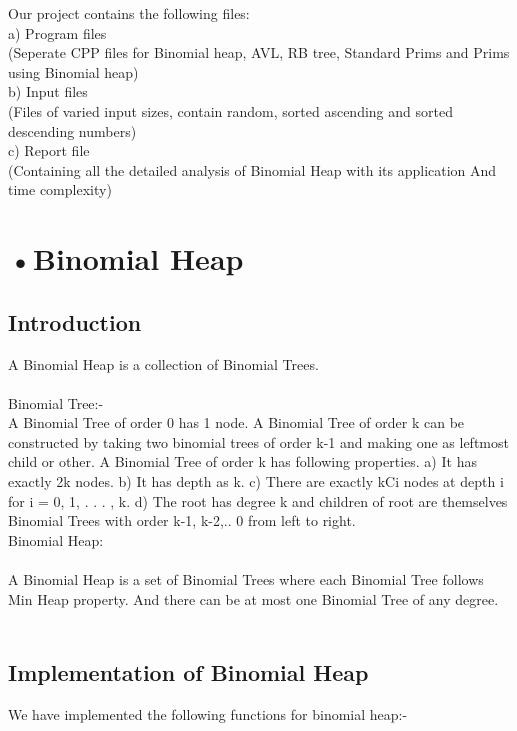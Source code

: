 Our project contains the following files:\\
a) Program files\\
	(Seperate CPP files for Binomial heap, AVL, RB tree, Standard Prims and Prims using Binomial heap)\\

b) Input files \\
	(Files of varied input sizes, contain random, sorted ascending and sorted descending  numbers)\\
	
c) Report file \\
	(Containing all the detailed analysis of Binomial Heap with its application And time complexity)

	

\section*{•Binomial Heap} 

\subsection*{Introduction}
	A Binomial Heap is a collection of Binomial Trees.\\ \\
Binomial Tree:- \\
A Binomial Tree of order 0 has 1 node. A Binomial Tree of order k can be constructed by taking two binomial trees of order k-1 and making one as leftmost child or other.
A Binomial Tree of order k has following properties.
a) It has exactly 2k nodes.
b) It has depth as k.
c) There are exactly kCi nodes at depth i for i = 0, 1, . . . , k.
d) The root has degree k and children of root are themselves Binomial Trees with order k-1, k-2,.. 0 from left to right.\\ 

Binomial Heap:\\ \\
A Binomial Heap is a set of Binomial Trees where each Binomial Tree follows Min Heap property. And there can be at most one Binomial Tree of any degree. \\ \\


\subsection*{Implementation of Binomial Heap}

We have implemented the following functions for binomial heap:- \\ 
	

